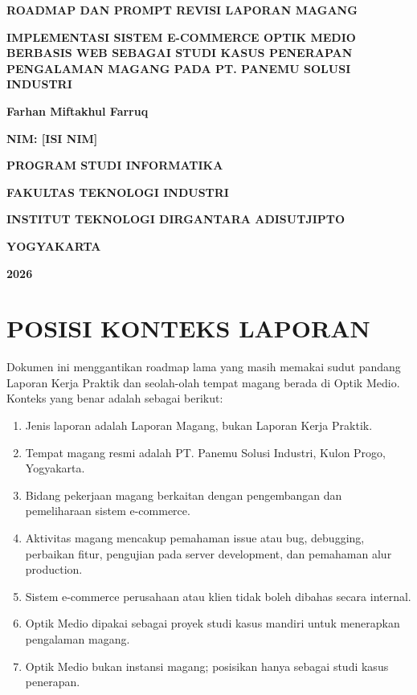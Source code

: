 \documentclass[12pt,a4paper]{report}
\begin{document}
\begin{titlepage}
\centering
\vspace*{2cm}
{\bfseries\Large ROADMAP DAN PROMPT REVISI LAPORAN MAGANG\par}
\vspace{1cm}
{\bfseries\Large IMPLEMENTASI SISTEM E-COMMERCE OPTIK MEDIO BERBASIS WEB SEBAGAI STUDI KASUS PENERAPAN PENGALAMAN MAGANG PADA PT. PANEMU SOLUSI INDUSTRI\par}
\vspace{1cm}
{\bfseries Farhan Miftakhul Farruq\par}
{\bfseries NIM: [ISI NIM]\par}
\vfill
{\bfseries PROGRAM STUDI INFORMATIKA\par}
{\bfseries FAKULTAS TEKNOLOGI INDUSTRI\par}
{\bfseries INSTITUT TEKNOLOGI DIRGANTARA ADISUTJIPTO\par}
{\bfseries YOGYAKARTA\par}
{\bfseries 2026\par}
\end{titlepage}

\tableofcontents

\chapter{POSISI KONTEKS LAPORAN}

Dokumen ini menggantikan roadmap lama yang masih memakai sudut pandang Laporan Kerja Praktik dan seolah-olah tempat magang berada di Optik Medio. Konteks yang benar adalah sebagai berikut:

\begin{enumerate}
    \item Jenis laporan adalah Laporan Magang, bukan Laporan Kerja Praktik.
    \item Tempat magang resmi adalah PT. Panemu Solusi Industri, Kulon Progo, Yogyakarta.
    \item Bidang pekerjaan magang berkaitan dengan pengembangan dan pemeliharaan sistem e-commerce.
    \item Aktivitas magang mencakup pemahaman issue atau bug, debugging, perbaikan fitur, pengujian pada server development, dan pemahaman alur production.
    \item Sistem e-commerce perusahaan atau klien tidak boleh dibahas secara internal.
    \item Optik Medio dipakai sebagai proyek studi kasus mandiri untuk menerapkan pengalaman magang.
    \item Optik Medio bukan instansi magang; posisikan hanya sebagai studi kasus penerapan.
\end{enumerate}
\end{document}
